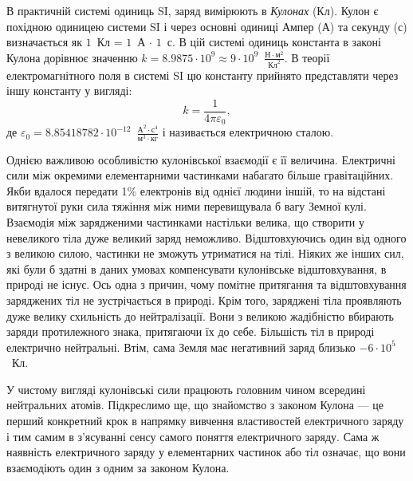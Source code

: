 В практичній системі одиниць SI, заряд вимірюють в \emph{Кулонах} (Кл). Кулон є похідною одиницею системи SI і через основні одиниці Ампер (А) та секунду (с) визначається як $1$~Кл = $1$~А $\cdot$ $1$~с. В цій системі одиниць константа в законі Кулона дорівнює значенню $k = 8.9875 \cdot 10^{9} \approx 9\cdot 10^{9}$~$\frac{\text{Н}\cdot\text{м}^2}{\text{Кл}^2}$. В теорії електромагнітного поля в системі SI цю константу прийнято представляти через іншу константу у вигляді:
\begin{equation}\label{}
    k = \frac{1}{4\pi\varepsilon_0},
\end{equation}
де $\varepsilon_0 = 8.85418782 \cdot 10^{-12}$~$\frac{\text{А}^2\cdot\text{с}^4}{\text{м}^3\cdot\text{кг}}$ і називається електричною сталою.



Однією важливою особливістю кулонівської взаємодії є її величина. Елек\-тричні сили між окремими елементарними частинками набагато більше гравітаційних. Якби вдалося передати 1\% електронів
від однієї людини іншій, то на відстані витягнутої руки сила тяжіння між ними перевищувала б вагу Земної кулі.  Взаємодія між зарядженими частинками настільки велика, що створити у невеликого тіла дуже великий заряд неможливо. Відштовхуючись один від одного з великою силою, частинки не зможуть утриматися на тілі. Ніяких же інших сил, які були б здатні в даних умовах компенсувати кулонівське відштовхування, в природі не існує. Ось одна з причин, чому помітне притягання та відштовхування заряджених тіл не зустрічається в природі. Крім того, заряджені тіла проявляють дуже велику схильність до нейтралізації. Вони з великою жадібністю вбирають заряди протилежного знака, притягаючи їх до себе. Більшість тіл в природі електрично нейтральні. Втім, сама Земля має негативний заряд близько $ - 6\cdot 10^5$~Кл.

У чистому вигляді кулонівські сили працюють головним чином всередині нейтральних атомів.  Підкреслимо ще, що знайомство з законом Кулона --- це перший конкретний крок в напрямку вивчення властивостей електричного заряду і тим самим в з'ясуванні сенсу самого поняття електричного заряду. Сама ж наявність електричного заряду у елементарних частинок або тіл означає, що вони взаємодіють один з одним за законом Кулона.

